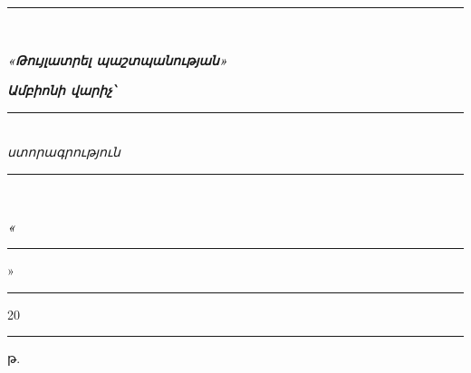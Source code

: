 \documentclass[12pt,a4paper]{report}
\begin{document}
\vspace{0.55cm}

\noindent\rule{\textwidth}{0.4pt}\\[-0.15cm]

\vspace{4.6cm}

\noindent
{\fontsize{13pt}{16pt}\selectfont\bfseries\itshape «Թույլատրել պաշտպանության»}

\vspace{1.9cm}

\noindent
{\fontsize{13pt}{16pt}\selectfont\bfseries\itshape Ամբիոնի վարիչ՝}
\hspace{0.3cm}
\begin{minipage}[t]{7.0cm}
\vspace{-0.35cm}
\rule{7.0cm}{0.4pt}\\[-0.15cm]
\centering
{\fontsize{10pt}{12pt}\selectfont\itshape ստորագրություն}
\end{minipage}

\vspace{0.55cm}

\noindent\rule{\textwidth}{0.4pt}\\[-0.15cm]

\vspace{1.6cm}

\noindent
{\fontsize{13pt}{16pt}\selectfont\bfseries\itshape «\rule{1.2cm}{0.4pt}» \rule{3.0cm}{0.4pt} 20\rule{0.7cm}{0.4pt}թ.}
\end{document}
